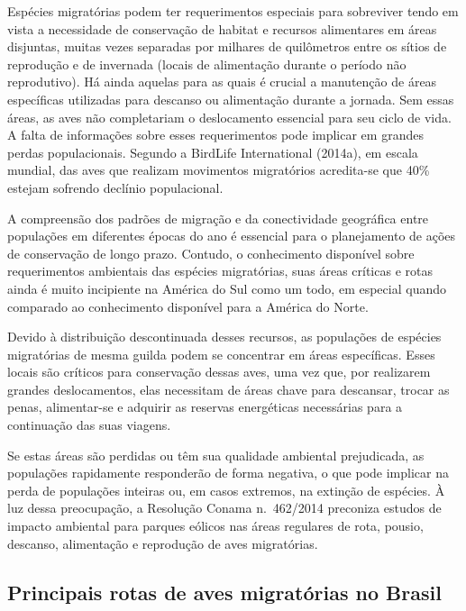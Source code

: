 \documentclass[
  oneside]{scrbook}
\begin{document}
Espécies migratórias podem ter requerimentos especiais para sobreviver tendo em vista a necessidade de conservação de habitat e recursos alimentares em áreas disjuntas, muitas vezes separadas por milhares de quilômetros entre os sítios de reprodução e de invernada (locais de alimentação durante o período não reprodutivo). Há ainda aquelas para as quais é crucial a manutenção de áreas específicas utilizadas para descanso ou alimentação durante a jornada. Sem essas áreas, as aves não completariam o deslocamento essencial para seu ciclo de vida. A falta de informações sobre esses requerimentos pode implicar em grandes perdas populacionais. Segundo a BirdLife International (2014a), em escala mundial, das aves que realizam movimentos migratórios acredita-se que 40\% estejam sofrendo declínio populacional.

A compreensão dos padrões de migração e da conectividade geográfica entre populações em diferentes épocas do ano é essencial para o planejamento de ações de conservação de longo prazo. Contudo, o conhecimento disponível sobre requerimentos ambientais das espécies migratórias, suas áreas críticas e rotas ainda é muito incipiente na América do Sul como um todo, em especial quando comparado ao conhecimento disponível para a América do Norte.

Devido à distribuição descontinuada desses recursos, as populações de espécies migratórias de mesma guilda podem se concentrar em áreas específicas. Esses locais são críticos para conservação dessas aves, uma vez que, por realizarem grandes deslocamentos, elas necessitam de áreas chave para descansar, trocar as penas, alimentar-se e adquirir as reservas energéticas necessárias para a continuação das suas viagens.

Se estas áreas são perdidas ou têm sua qualidade ambiental prejudicada, as populações rapidamente responderão de forma negativa, o que pode implicar na perda de populações inteiras ou, em casos extremos, na extinção de espécies. À luz dessa preocupação, a Resolução Conama n.~462/2014 preconiza estudos de impacto ambiental para parques eólicos nas áreas regulares de rota, pousio, descanso, alimentação e reprodução de aves migratórias.

\hypertarget{rotas}{%
\subsection{Principais rotas de aves migratórias no Brasil}\label{rotas}}
\end{document}
